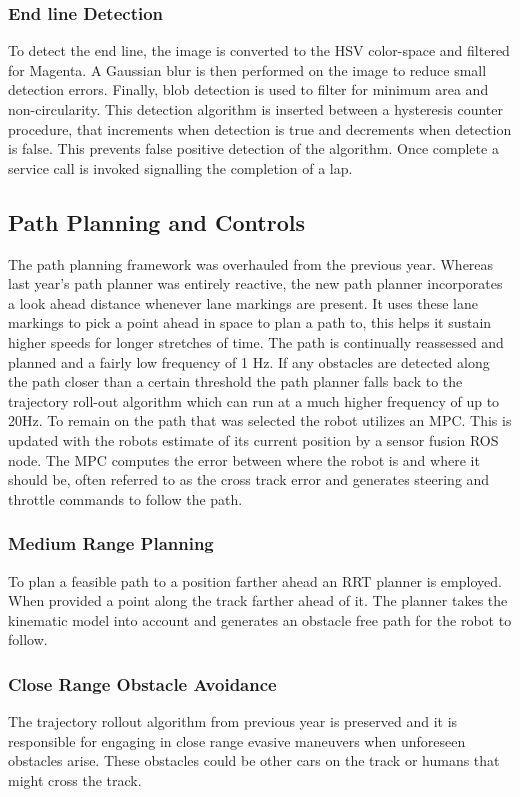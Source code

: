 \documentclass[11pt,journal]{IEEEtran}
\begin{document}
\subsubsection{End line Detection}
To detect the end line, the image is converted to the HSV color-space and filtered for Magenta. A Gaussian blur is then performed on the image to reduce small detection errors. Finally, blob detection is used to filter for minimum area and non-circularity. This detection algorithm is inserted between a hysteresis counter procedure, that increments when detection is true and decrements when detection is false. This prevents false positive detection of the algorithm. Once complete a service call is invoked signalling the completion of a lap.

\subsection{Path Planning and Controls}
The path planning framework was overhauled from the previous year. Whereas last year's path planner was entirely reactive, the new path planner incorporates a look ahead distance whenever lane markings are present. It uses these lane markings to pick a point ahead in space to plan a path to, this helps it sustain higher speeds for longer stretches of time. The path is continually reassessed and planned and a fairly low frequency of 1 Hz. If any obstacles are detected along the path closer than a certain threshold the path planner falls back to the trajectory roll-out algorithm which can run at a much higher frequency of up to 20Hz.
To remain on the path that was selected the robot utilizes an MPC. This is updated with the robots estimate of its current position by a sensor fusion ROS node. The MPC computes the error between where the robot is and where it should be, often referred to as the cross track error and generates steering and throttle commands to follow the path.

\subsubsection{Medium Range Planning}
To plan a feasible path to a position farther ahead an RRT planner is employed. When provided a point along the track farther ahead of it. The planner takes the kinematic model into account and generates an obstacle free path for the robot to follow.

\subsubsection{Close Range Obstacle Avoidance}
The trajectory rollout algorithm from previous year is preserved and it is responsible for engaging in close range evasive maneuvers when unforeseen obstacles arise. These obstacles could be other cars on the track or humans that might cross the track.
\end{document}
